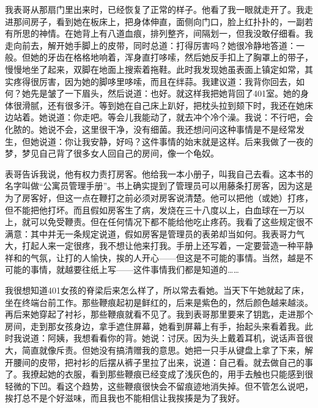 我表哥从那扇门里出来时，已经恢复了正常的样子。他看了我一眼就走开了。我走进那间房子，看到她在板床上，把身体伸直，面侧向门口，脸上红扑扑的，一副若有所思的神情。在她背上有八道血痕，排列整齐，间隔划一，但我没敢仔细看。我走向前去，解开她手脚上的皮带，同时总道：打得厉害吗？她很冷静地答道：一般。但她的牙齿在格格地响着，浑身直打哆嗦，然后她反手扣上了胸罩上的带子，慢慢地坐了起来，双脚在地面上搜索着拖鞋。此时我发现她虽表面上镇定如常，其实疼得很厉害，因为她的脚哆里哆嗦，而且在绊蒜。我建议道：我背你回去，如何？她先是皱了一下眉头，然后说道：也好。就这样我把她背回了401室。她的身体很滑腻，还有很多汗。等到她在自己床上趴好，把枕头拉到颏下时，我还在她床边站着。她说道：你走吧。等会儿我能动了，就去冲个冷个澡。我说：不行吧，会化脓的。她说不会，这里很干净，没有细菌。我还想问问这种事情是不是经常发生，但她说道：你让我安静，好吗？这件事情的始末就是这样。后来我做了一夜的梦，梦见自己背了很多女人回自己的房间，像一个龟奴。 

表哥告诉我说，他有权力责打房客。他给我一本小册子，叫我自己去看。这本书的名字叫做“公寓员管理手册”。书上确实提到了管理员可以用藤条打房客，因为这是为了房客好，但这一点在鞭打之前必须对房客说清楚。他可以把他（或她）打疼，但不能把他打坏。而且假如房客生了病，发烧在三十八度以上，白血球在一万以上，就可以免受鞭责。但在任何情况下都不能给他吃止疼药。我看了这些规定很不满意：其中并无一条规定说道，假如房客是管理员的表弟却当如何。我表哥力气大，打起人来一定很疼，我不想让他来打我。手册上还写着，一定要营造一种平静祥和的气氛，让打的人愉快，挨的人开心——但这是不可能的事情。当然，越是不可能的事情，就越要往纸上写——这件事情我们都是知道的…… 

我很想知道401女孩的脊梁后来怎么样了，所以常去看她。当天下午她就起了床，坐在终端台前工作。那些鞭痕起初是鲜红的，后来是紫色的，然后颜色越来越淡。再后来她穿起了衬衫，那些鞭痕就看不见了。我到表哥那里要来了钥匙，走进那个房间，走到那女孩身边，拿手遮住屏幕，她看到屏幕上有手，抬起头来看着我。此时我说道：阿姨，我想看看你的背。她说：讨厌。因为头上戴着耳机，说话声音很大，简直就像斥责。但她没有搞清赠我的意思。她把一只手从键盘上拿了下来，解开腰间的皮带，把衬衫的后摆从裤子里拉了出来，说道：自己看。就去做自己的事了。我撩起她的衣服，看到那些鞭痕已经变成了浅灰色的，用手去触也只能感到很轻微的下凹。看这个趋势，这些鞭痕很快会不留痕迹地消失掉。但不管怎么说吧，挨打总不是个好滋味，而且我也不能相信让我挨揍是为了我好。 


